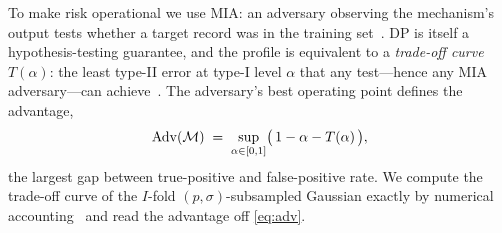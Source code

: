 To make risk operational we use \ac{MIA}: an
adversary observing the mechanism's output tests whether a target
record was in the training set~\cite{yeom2018privacy,
carlini2022membership}. \ac{DP} is itself a hypothesis-testing guarantee,
and the profile is equivalent to a \emph{trade-off curve}
$T(\alpha)$: the least type-II error at type-I level $\alpha$ that
any test---hence any \ac{MIA} adversary---can
achieve~\cite{dong2022gaussian}. The adversary's best operating
point defines the advantage,
\begin{equation}
\mathrm{Adv}(\mathcal{M}) \;=\; \sup_{\alpha \in [0,1]}
\bigl(\,1 - \alpha - T(\alpha)\,\bigr),
\label{eq:adv}
\end{equation}
the largest gap between true-positive and false-positive rate. We
compute the trade-off curve of the $I$-fold $(p,\sigma)$-subsampled
Gaussian exactly by numerical
accounting~\cite{google-dp-accounting} and read the advantage off
\cref{eq:adv}.

